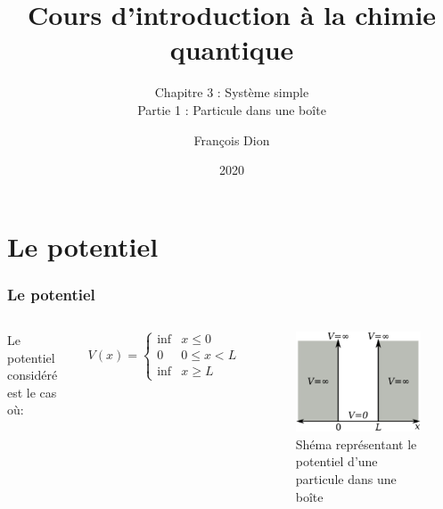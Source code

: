 \documentclass[aspectratio=169]{beamer}
\title{Cours d'introduction à la chimie quantique}
\subtitle{Chapitre 3 : Système simple\\Partie 1 : Particule dans une boîte}
\author{François Dion}
\date{2020}
\begin{document}
\frame{\titlepage}




\section{Le potentiel}
\begin{frame}
\frametitle{Le potentiel}
\begin{columns}
Le potentiel considéré est le cas où:


\begin{equation} \tag{1}
V(x)=\left\{\begin{array}{cc} \inf & x\leq 0 \\
     0 & 0\leq x < L \\
      \inf & x \geq L 
  \end{array} \right. \label{eq2}
\end{equation} 
\begin{figure}
\includegraphics[scale=0.4]{Pot}
\caption{Shéma représentant le potentiel d'une particule dans une boîte}
\end{figure}
\end{columns}
\end{frame}
\end{document}
